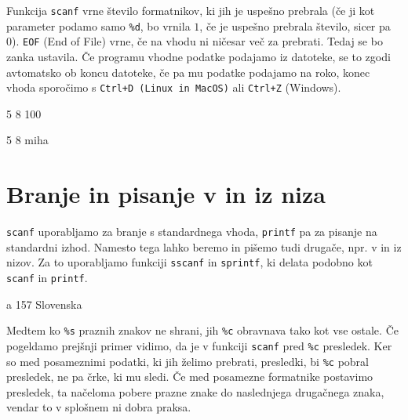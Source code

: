\documentclass{book}
\begin{document}
\vskip 0.15in
\noindent Funkcija \verb+scanf+ vrne število formatnikov, ki jih je uspešno
prebrala (če ji kot parameter podamo samo \verb+%d+, bo vrnila $1$, če je
uspešno prebrala število, sicer pa 0). \verb+EOF+ (End of File) vrne, če na
vhodu ni ničesar več za prebrati. Tedaj se bo zanka ustavila. Če programu
vhodne podatke podajamo iz datoteke, se to zgodi avtomatsko ob koncu datoteke,
če pa mu podatke podajamo na roko, konec vhoda sporočimo s
\verb-Ctrl+D (Linux in MacOS)- ali \verb-Ctrl+Z- (Windows).

\begin{examples}


\begin{inout}
	5 8 100
\end{inout}
\begin{inout}
	5 8 miha
\end{inout}


\end{examples}

\newpage
\section{Branje in pisanje v in iz niza}

\verb+scanf+ uporabljamo za branje s standardnega vhoda, \verb+printf+ pa za pisanje na standardni izhod.
Namesto tega lahko beremo in pišemo tudi drugače, npr. v in iz nizov.
Za to uporabljamo funkciji \verb+sscanf+ in \verb+sprintf+, ki delata podobno kot \verb+scanf+ in \verb+printf+.

\begin{examples}


\begin{inout}

\tcblower
a 157 Slovenska
\end{inout}

\end{examples}

\begin{errors}
Medtem ko \verb+%s+ praznih znakov ne shrani, jih \verb+%c+ obravnava tako kot
vse ostale. Če pogeldamo prejšnji primer vidimo, da je v funkciji
\verb+scanf+ pred \verb+%c+ presledek. Ker so med posameznimi podatki, ki
jih želimo prebrati, presledki, bi \verb+%c+ pobral presledek, ne pa črke,
ki mu sledi. Če med posamezne formatnike postavimo presledek, ta načeloma
pobere prazne znake do naslednjega drugačnega znaka, vendar to v splošnem
ni dobra praksa.
\end{errors}
\end{document}
